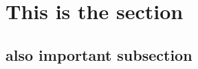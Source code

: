\section{This is the section}
\label{sec:important-section}

\subsection{also important subsection}
\label{ssec:important-subsection}
